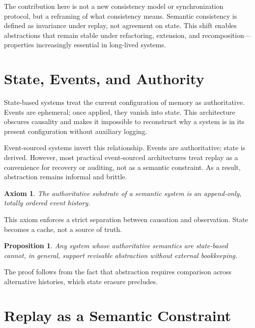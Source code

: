 \documentclass[11pt]{article}
\newtheorem{axiom}{Axiom}[section]
\newtheorem{proposition}{Proposition}[section]
\begin{document}
The contribution here is not a new consistency model or synchronization protocol, but a reframing of what consistency means. Semantic consistency is defined as invariance under replay, not agreement on state. This shift enables abstractions that remain stable under refactoring, extension, and recomposition—properties increasingly essential in long-lived systems.

\section{State, Events, and Authority}

State-based systems treat the current configuration of memory as authoritative. Events are ephemeral; once applied, they vanish into state. This architecture obscures causality and makes it impossible to reconstruct why a system is in its present configuration without auxiliary logging.

Event-sourced systems invert this relationship. Events are authoritative; state is derived. However, most practical event-sourced architectures treat replay as a convenience for recovery or auditing, not as a semantic constraint. As a result, abstraction remains informal and brittle.

\begin{axiom}
The authoritative substrate of a semantic system is an append-only, totally ordered event history.
\end{axiom}

This axiom enforces a strict separation between causation and observation. State becomes a cache, not a source of truth.

\begin{proposition}
Any system whose authoritative semantics are state-based cannot, in general, support revisable abstraction without external bookkeeping.
\end{proposition}

The proof follows from the fact that abstraction requires comparison across alternative histories, which state erasure precludes.

\section{Replay as a Semantic Constraint}
\end{document}
